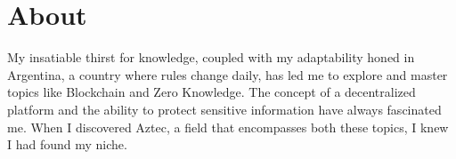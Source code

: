 \section{About}
\small{
My insatiable thirst for knowledge, coupled with my adaptability honed in Argentina, a country where rules change daily, has led me to explore and master topics like Blockchain and Zero Knowledge. The concept of a decentralized platform and the ability to protect sensitive information have always fascinated me. When I discovered Aztec, a field that encompasses both these topics, I knew I had found my niche.
}
